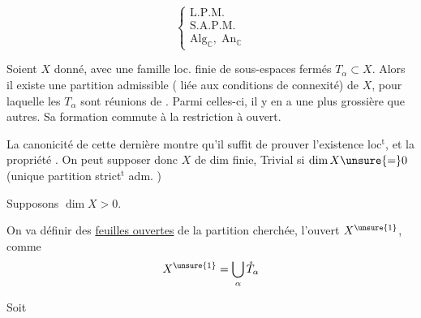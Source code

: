 \[
\left\{\begin{array}{l}
\mathrm{L.P.M.}\\
\mathrm{S.A.P.M.}\\
\mathrm{Alg}_{\mathbb C},\;\mathrm{An}_{\mathbb C}
\end{array}\right.
\]

Soient $X$ donné, avec une famille loc. finie de sous-espaces fermés $T_\alpha\subset X$. Alors il existe une partition  admissible ( liée aux conditions de connexité) de $X$, pour laquelle les $T_\alpha$ sont réunions de . Parmi celles-ci, il y en a une plus grossière que  autres. Sa formation commute à la restriction à  ouvert.

La canonicité de cette dernière montre qu'il suffit de prouver l'existence loc$^{\mathrm t}$, et la propriété . On peut supposer donc $X$ de dim finie,   Trivial si $\dim X\unsure{=}0$ (unique partition strict$^{\mathrm t}$ adm. )


Supposons $\dim X>0$.

On va définir  des \uline{feuilles ouvertes} de la partition cherchée,   l'ouvert $X^{\unsure{1}}$, comme
\[
X^{\unsure{1}}=\bigcup_\alpha \mathring{T}_\alpha
\]

Soit

